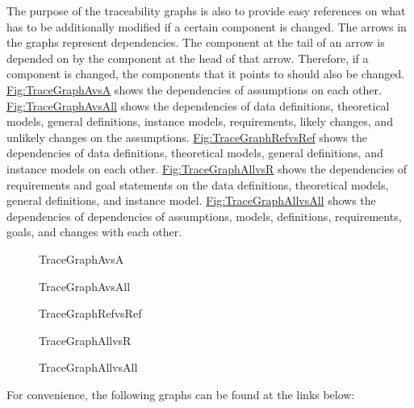 \documentclass[12pt]{article}
\begin{document}
The purpose of the traceability graphs is also to provide easy references on what has to be additionally modified if a certain component is changed. The arrows in the graphs represent dependencies. The component at the tail of an arrow is depended on by the component at the head of that arrow. Therefore, if a component is changed, the components that it points to should also be changed. \hyperref[Figure:TraceGraphAvsA]{Fig:TraceGraphAvsA} shows the dependencies of assumptions on each other. \hyperref[Figure:TraceGraphAvsAll]{Fig:TraceGraphAvsAll} shows the dependencies of data definitions, theoretical models, general definitions, instance models, requirements, likely changes, and unlikely changes on the assumptions. \hyperref[Figure:TraceGraphRefvsRef]{Fig:TraceGraphRefvsRef} shows the dependencies of data definitions, theoretical models, general definitions, and instance models on each other. \hyperref[Figure:TraceGraphAllvsR]{Fig:TraceGraphAllvsR} shows the dependencies of requirements and goal statements on the data definitions, theoretical models, general definitions, and instance model. \hyperref[Figure:TraceGraphAllvsAll]{Fig:TraceGraphAllvsAll} shows the dependencies of dependencies of assumptions, models, definitions, requirements, goals, and changes with each other.

\begin{figure}[H]
\begin{center}

\caption{TraceGraphAvsA}
\label{Figure:TraceGraphAvsA}
\end{center}
\end{figure}
\begin{figure}[H]
\begin{center}

\caption{TraceGraphAvsAll}
\label{Figure:TraceGraphAvsAll}
\end{center}
\end{figure}
\begin{figure}[H]
\begin{center}

\caption{TraceGraphRefvsRef}
\label{Figure:TraceGraphRefvsRef}
\end{center}
\end{figure}
\begin{figure}[H]
\begin{center}

\caption{TraceGraphAllvsR}
\label{Figure:TraceGraphAllvsR}
\end{center}
\end{figure}
\begin{figure}[H]
\begin{center}

\caption{TraceGraphAllvsAll}
\label{Figure:TraceGraphAllvsAll}
\end{center}
\end{figure}
For convenience, the following graphs can be found at the links below:
\end{document}
